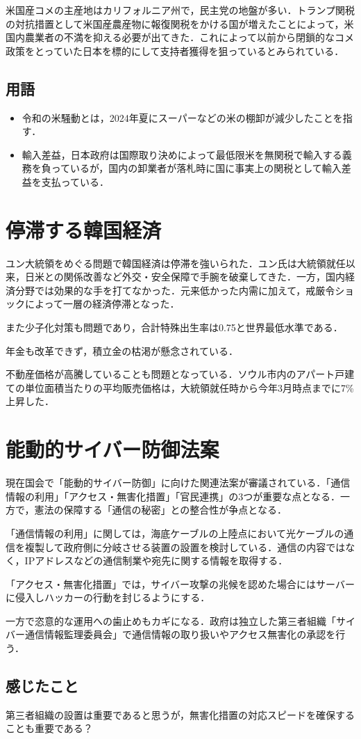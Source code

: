\documentclass{ltjsarticle}
\begin{document}
米国産コメの主産地はカリフォルニア州で，民主党の地盤が多い．トランプ関税の対抗措置として米国産農産物に報復関税をかける国が増えたことによって，米国内農業者の不満を抑える必要が出てきた．これによって以前から閉鎖的なコメ政策をとっていた日本を標的にして支持者獲得を狙っているとみられている．


\subsection{用語}

\begin{itemize}
  \item 令和の米騒動とは，2024年夏にスーパーなどの米の棚卸が減少したことを指す．
  \item 輸入差益，日本政府は国際取り決めによって最低限米を無関税で輸入する義務を負っているが，国内の卸業者が落札時に国に事実上の関税として輸入差益を支払っている．
\end{itemize}



\section{停滞する韓国経済}

ユン大統領をめぐる問題で韓国経済は停滞を強いられた．ユン氏は大統領就任以来，日米との関係改善など外交・安全保障で手腕を破棄してきた．一方，国内経済分野では効果的な手を打てなかった．元来低かった内需に加えて，戒厳令ショックによって一層の経済停滞となった．

また少子化対策も問題であり，合計特殊出生率は0.75と世界最低水準である．

年金も改革できず，積立金の枯渇が懸念されている．

不動産価格が高騰していることも問題となっている．ソウル市内のアパート戸建ての単位面積当たりの平均販売価格は，大統領就任時から今年3月時点までに7\%上昇した．


\section{能動的サイバー防御法案}

現在国会で「能動的サイバー防御」に向けた関連法案が審議されている．「通信情報の利用」「アクセス・無害化措置」「官民連携」の3つが重要な点となる．一方で，憲法の保障する「通信の秘密」との整合性が争点となる．

「通信情報の利用」に関しては，海底ケーブルの上陸点において光ケーブルの通信を複製して政府側に分岐させる装置の設置を検討している．通信の内容ではなく，IPアドレスなどの通信制業や宛先に関する情報を取得する．

「アクセス・無害化措置」では，サイバー攻撃の兆候を認めた場合にはサーバーに侵入しハッカーの行動を封じるようにする．

一方で恣意的な運用への歯止めもカギになる．政府は独立した第三者組織「サイバー通信情報監理委員会」で通信情報の取り扱いやアクセス無害化の承認を行う．

\subsection{感じたこと}

第三者組織の設置は重要であると思うが，無害化措置の対応スピードを確保することも重要である？
\end{document}
